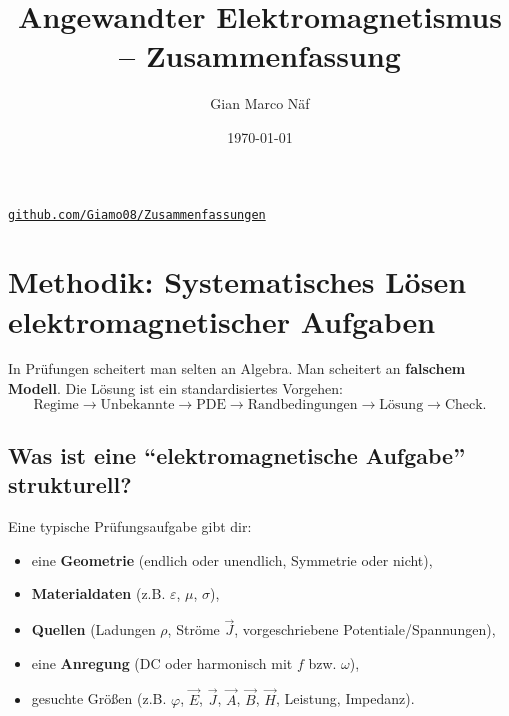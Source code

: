 \documentclass[a4paper]{article}
\author{Gian Marco Näf}
\title{Angewandter Elektromagnetismus -- Zusammenfassung}
\date{\today}
\newcommand{\imp}[1]{{\color{accent}\bfseries #1}}
\newcommand{\E}{\vec E}
\newcommand{\Hf}{\vec H}
\newcommand{\B}{\vec B}
\newcommand{\J}{\vec J}
\newcommand{\A}{\vec A}
\newcommand{\eps}{\varepsilon}
\begin{document}
\maketitle
\begin{center}
\vspace{1em}


\vspace{0.3em}

\href{https://github.com/Giamo08/Zusammenfassungen}{\texttt{github.com/Giamo08/Zusammenfassungen}}
\end{center}

\setcounter{tocdepth}{2}
\tableofcontents



\newpage


\section{Methodik: Systematisches Lösen elektromagnetischer Aufgaben}

\begin{merke}
In Prüfungen scheitert man selten an Algebra. Man scheitert an \imp{falschem Modell}.
Die Lösung ist ein standardisiertes Vorgehen:
\[
\text{Regime} \rightarrow \text{Unbekannte} \rightarrow \text{PDE} \rightarrow \text{Randbedingungen} \rightarrow \text{Lösung} \rightarrow \text{Check}.
\]
\end{merke}

\subsection{Was ist eine ``elektromagnetische Aufgabe'' strukturell?}

Eine typische Prüfungsaufgabe gibt dir:
\begin{itemize}
  \item eine \imp{Geometrie} (endlich oder unendlich, Symmetrie oder nicht),
  \item \imp{Materialdaten} (z.B. $\eps$, $\mu$, $\sigma$),
  \item \imp{Quellen} (Ladungen $\rho$, Ströme $\J$, vorgeschriebene Potentiale/Spannungen),
  \item eine \imp{Anregung} (DC oder harmonisch mit $f$ bzw. $\omega$),
  \item gesuchte Größen (z.B. $\varphi$, $\E$, $\J$, $\A$, $\B$, $\Hf$, Leistung, Impedanz).
\end{itemize}
\end{document}
